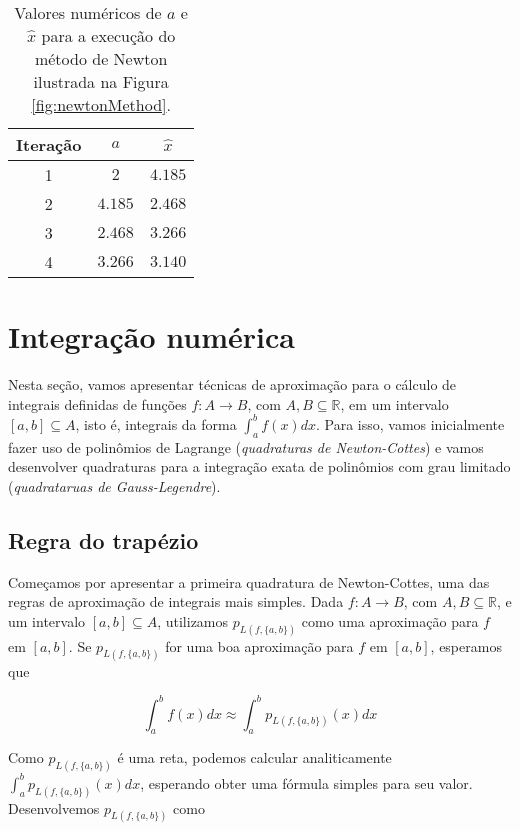 \documentclass[]{article}
\numberwithin{equation}{section}
\begin{document}
\begin{table}[h]
  \centering
  \begin{tabular}{|c|c|c|}
    \hline
    Iteração & $a$     & $\hat{x}$ \\ \hline
    1        & $2$     & $4.185$   \\ \hline
    2        & $4.185$ & $2.468$   \\ \hline
    3        & $2.468$ & $3.266$   \\ \hline
    4        & $3.266$ & $3.140$   \\ \hline
  \end{tabular}
  \caption{Valores numéricos de $a$ e $\hat{x}$ para a execução do
    método de Newton ilustrada na Figura \ref{fig:newtonMethod}.}
  \label{tab:newtonMethod}
\end{table}

\section{Integração numérica}

Nesta seção, vamos apresentar técnicas de aproximação para o cálculo
de integrais definidas de funções $f : A \to B$, com
$A, B \subseteq \mathbb{R}$, em um intervalo $[a, b] \subseteq A$,
isto é, integrais da forma $\int_a^b f(x) dx$. Para isso, vamos
inicialmente fazer uso de polinômios de Lagrange (\emph{quadraturas de
  Newton-Cottes}) e vamos desenvolver quadraturas para a integração
exata de polinômios com grau limitado (\emph{quadrataruas de
  Gauss-Legendre}).

\subsection{Regra do trapézio}

Começamos por apresentar a primeira quadratura de Newton-Cottes, uma
das regras de aproximação de integrais mais simples. Dada
$f : A \to B$, com $A, B \subseteq \mathbb{R}$, e um intervalo
$[a, b] \subseteq A$, utilizamos $p_{L(f, \{a, b\})}$ como uma
aproximação para $f$ em $[a, b]$. Se $p_{L(f, \{a, b\})}$ for uma boa
aproximação para $f$ em $[a, b]$, esperamos que

$$
\int_{a}^{b} f(x) dx \approx \int_{a}^{b} p_{L(f, \{a, b\})}(x) dx
$$

Como $p_{L(f, \{a, b\})}$ é uma reta, podemos calcular analiticamente
$\int_{a}^{b} p_{L(f, \{a, b\})}(x) dx$, esperando obter uma fórmula
simples para seu valor. Desenvolvemos $p_{L(f, \{a, b\})}$ como
\end{document}
